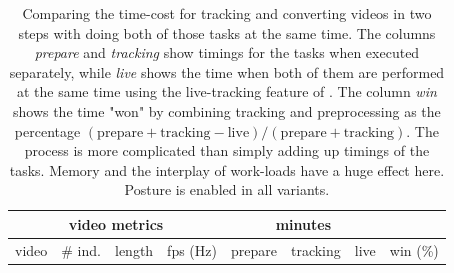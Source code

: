 \documentclass[9pt,lineno]{elife}
\newcommand{\TGrabs}{\protect\path{TGrabs}}
\begin{document}
\begin{table}[h]
\caption{\label{tab:timings}Comparing the time-cost for tracking and converting videos in two steps with doing both of those tasks at the same time. The columns \textit{prepare} and \textit{tracking} show timings for the tasks when executed separately, while \textit{live} shows the time when both of them are performed at the same time using the live-tracking feature of \TGrabs{}. The column \textit{win} shows the time "won" by combining tracking and preprocessing as the percentage $(\mathrm{prepare}+\mathrm{tracking}-\mathrm{live})/(\mathrm{prepare}+\mathrm{tracking})$. The process is more complicated than simply adding up timings of the tasks. Memory and the interplay of work-loads have a huge effect here. Posture is enabled in all variants.}
\begin{tabular}{l l l l | l l l | r}
\toprule
\multicolumn{4}{c|}{video metrics} & \multicolumn{3}{c|}{minutes} & \\
\midrule
video & {\# ind.} & length & fps (Hz) & prepare &  tracking  & live & win (\%)   \\
\midrule


\end{tabular}
\end{table}
\end{document}
